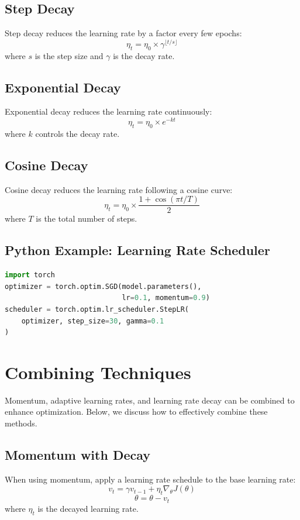 \begin{notechapter}
\subsection{Step Decay}
Step decay reduces the learning rate by a factor every few 
epochs:
\[
\eta_t = \eta_0 \times \gamma^{\lfloor t / s \rfloor}
\]
where \(s\) is the step size and \(\gamma\) is the decay rate.

\subsection{Exponential Decay}
Exponential decay reduces the learning rate continuously:
\[
\eta_t = \eta_0 \times e^{-kt}
\]
where \(k\) controls the decay rate.

\subsection{Cosine Decay}
Cosine decay reduces the learning rate following a cosine 
curve:
\[
\eta_t = \eta_0 \times \frac{1 + \cos(\pi t / T)}{2}
\]
where \(T\) is the total number of steps.

\subsection{Python Example: Learning Rate Scheduler}
\begin{lstlisting}[language=Python]
import torch
optimizer = torch.optim.SGD(model.parameters(), 
                            lr=0.1, momentum=0.9)
scheduler = torch.optim.lr_scheduler.StepLR(
    optimizer, step_size=30, gamma=0.1
)
\end{lstlisting}

\section{Combining Techniques}
Momentum, adaptive learning rates, and learning rate decay 
can be combined to enhance optimization. Below, we discuss 
how to effectively combine these methods.

\subsection{Momentum with Decay}
When using momentum, apply a learning rate schedule to the 
base learning rate:
\[
v_t = \gamma v_{t-1} + \eta_t \nabla_\theta J(\theta)
\]
\[
\theta = \theta - v_t
\]
where \(\eta_t\) is the decayed learning rate.


\end{notechapter}
